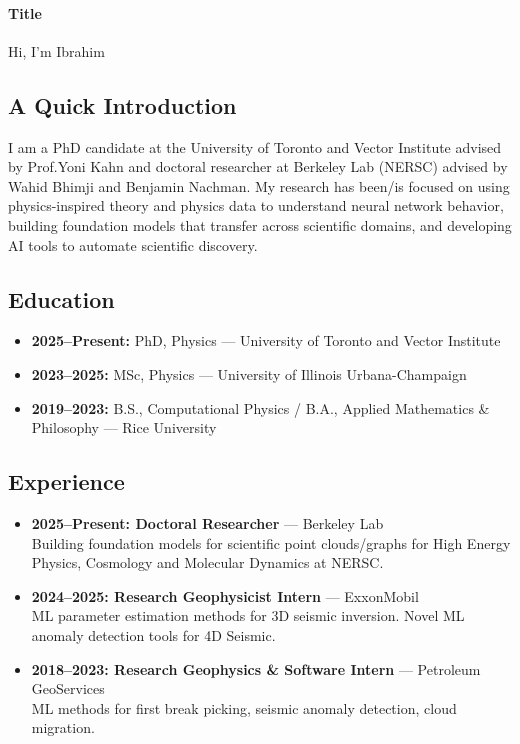 \documentclass[11pt]{article}
\begin{document}
\paragraph{Title}
Hi, I'm Ibrahim

\subsection{A Quick Introduction}
\label{sec:about-intro}

I am a PhD candidate at the University of Toronto and Vector Institute advised by Prof.Yoni Kahn and doctoral researcher at Berkeley Lab (NERSC) advised by Wahid Bhimji and Benjamin Nachman.  My research has been/is focused on using physics-inspired theory and physics data to understand neural network behavior, building foundation models that transfer across scientific domains, and developing AI tools to automate scientific discovery.


\subsection{Education}
\label{sec:about-education}

\begin{itemize}
    \item \textbf{2025--Present:} PhD, Physics --- University of Toronto and Vector Institute
    \item \textbf{2023--2025:} MSc, Physics --- University of Illinois Urbana-Champaign
    \item \textbf{2019--2023:} B.S., Computational Physics / B.A., Applied Mathematics \& Philosophy --- Rice University
\end{itemize}

\subsection{Experience}
\label{sec:about-experience}

\begin{itemize}
    \item \textbf{2025--Present: Doctoral Researcher} --- Berkeley Lab\\
    Building foundation models for scientific point clouds/graphs for High Energy Physics, Cosmology and Molecular Dynamics at NERSC.

    \item \textbf{2024--2025: Research Geophysicist Intern} --- ExxonMobil\\
    ML parameter estimation methods for 3D seismic inversion. Novel ML anomaly detection tools for 4D Seismic.

    \item \textbf{2018--2023: Research Geophysics \& Software Intern} --- Petroleum GeoServices\\
    ML methods for first break picking, seismic anomaly detection, cloud migration.
\end{itemize}
\end{document}
